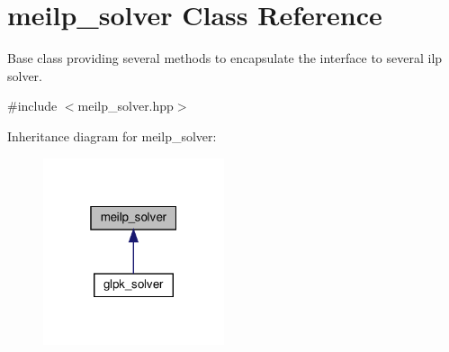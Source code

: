 \hypertarget{classmeilp__solver}{}\section{meilp\+\_\+solver Class Reference}
\label{classmeilp__solver}


Base class providing several methods to encapsulate the interface to several ilp solver.  




{\ttfamily \#include $<$meilp\+\_\+solver.\+hpp$>$}



Inheritance diagram for meilp\+\_\+solver\+:
\nopagebreak
\begin{figure}[H]
\begin{center}
\leavevmode
\includegraphics[width=151pt]{d1/dfc/classmeilp__solver__inherit__graph}
\end{center}
\end{figure}
